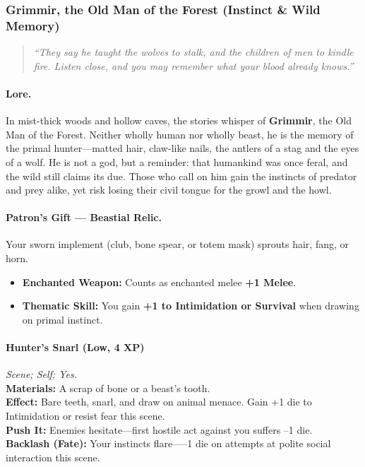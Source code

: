 \subsubsection{Grimmir, the Old Man of the Forest (Instinct \& Wild Memory)}
\begin{quote}\itshape
“They say he taught the wolves to stalk, and the children of men to kindle fire. Listen close, and you may remember what your blood already knows.”
\end{quote}

\paragraph{Lore.}
In mist-thick woods and hollow caves, the stories whisper of \textbf{Grimmir}, the Old Man of the Forest. Neither wholly human nor wholly beast, he is the memory of the primal hunter—matted hair, claw-like nails, the antlers of a stag and the eyes of a wolf. He is not a god, but a reminder: that humankind was once feral, and the wild still claims its due. Those who call on him gain the instincts of predator and prey alike, yet risk losing their civil tongue for the growl and the howl.

\paragraph{Patron’s Gift — Beastial Relic.}
Your sworn implement (club, bone spear, or totem mask) sprouts hair, fang, or horn.
\begin{itemize}
  \item \textbf{Enchanted Weapon:} Counts as enchanted melee \textbf{+1 Melee}.
  \item \textbf{Thematic Skill:} You gain \textbf{+1 to Intimidation or Survival} when drawing on primal instinct.
\end{itemize}


\paragraph{Hunter’s Snarl (Low, 4 XP)} \emph{Scene; Self; Yes.}\\
\textbf{Materials:} A scrap of bone or a beast’s tooth.\\
\textbf{Effect:} Bare teeth, snarl, and draw on animal menace. Gain +1 die to Intimidation or resist fear this scene.\\
\textbf{Push It:} Enemies hesitate—first hostile act against you suffers --1 die.\\
\textbf{Backlash (Fate):} Your instincts flare—--1 die on attempts at polite social interaction this scene.

